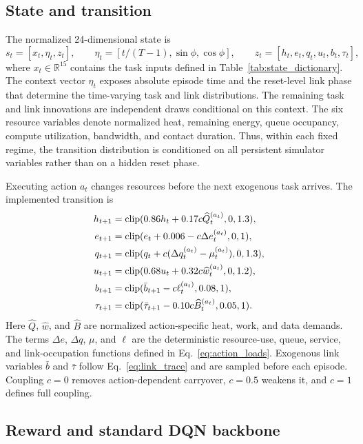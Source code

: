 \documentclass[11pt]{article}
\newcommand{\R}{\mathbb{R}}
\DeclareMathOperator{\clip}{clip}
\begin{document}
\subsection{State and transition}

The normalized 24-dimensional state is
\begin{equation}
s_t=[x_t,\eta_t,z_t],\qquad
\eta_t=[t/(T-1),\sin\phi,\cos\phi],\qquad
z_t=[h_t,e_t,q_t,u_t,b_t,\tau_t],
\end{equation}
where $x_t\in\R^{15}$ contains the task inputs defined in Table~\ref{tab:state_dictionary}. The context vector $\eta_t$ exposes absolute episode time and the reset-level link phase that determine the time-varying task and link distributions. The remaining task and link innovations are independent draws conditional on this context. The six resource variables denote normalized heat, remaining energy, queue occupancy, compute utilization, bandwidth, and contact duration. Thus, within each fixed regime, the transition distribution is conditioned on all persistent simulator variables rather than on a hidden reset phase.

Executing action $a_t$ changes resources before the next exogenous task arrives. The implemented transition is
\begin{align}
h_{t+1}&=\clip(0.86h_t+0.17c\widehat Q_t^{(a_t)},0,1.3),\notag\\
e_{t+1}&=\clip(e_t+0.006-c\Delta e_t^{(a_t)},0,1),\notag\\
q_{t+1}&=\clip(q_t+c(\Delta q_t^{(a_t)}-\mu_t^{(a_t)}),0,1.3),\notag\\
u_{t+1}&=\clip(0.68u_t+0.32c\widehat w_t^{(a_t)},0,1.2),\notag\\
b_{t+1}&=\clip(\bar b_{t+1}-c\ell_t^{(a_t)},0.08,1),\notag\\
\tau_{t+1}&=\clip(\bar\tau_{t+1}-0.10c\widehat B_t^{(a_t)},0.05,1).
\label{eq:transition}
\end{align}
Here $\widehat Q$, $\widehat w$, and $\widehat B$ are normalized action-specific heat, work, and data demands. The terms $\Delta e$, $\Delta q$, $\mu$, and $\ell$ are the deterministic resource-use, queue, service, and link-occupation functions defined in Eq.~\eqref{eq:action_loads}. Exogenous link variables $\bar b$ and $\bar\tau$ follow Eq.~\eqref{eq:link_trace} and are sampled before each episode. Coupling $c=0$ removes action-dependent carryover, $c=0.5$ weakens it, and $c=1$ defines full coupling.

\subsection{Reward and standard DQN backbone}
\end{document}
